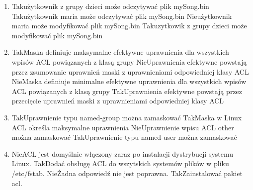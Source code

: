 \begin{enumerate}
	\item {}
	{Tak}{użytkownik z grupy dzieci może odczytywać plik mySong.bin}
	{Tak}{użytkownik maria może odczytywać plik mySong.bin}
	{Nie}{użytkownik maria może modyfikować plik mySong.bin}
	{Tak}{uzytkowik z grupy dzieci może modyfikować plik mySong.bin}
	
	\newpage
	
	\item {}
	{Tak}{Maska definiuje maksymalne efektywne uprawnienia dla wszystkich wpisów ACL powiązanych z klasą grupy}
	{Nie}{Uprawnienia efektywne powstają przez zsumowanie uprawnień maski z uprawnieniami odpowiedniej klasy ACL}
	{Nie}{Maska definiuje minimalne efektywne uprawnienia dla wszystkich wpisów ACL powiązanych z klasą grupy}
	{Tak}{Uprawnienia efektywne powstają przez przecięcie uprawnień maski z uprawnieniami odpowiedniej klasy ACL}

	\item {}
	{Tak}{Uprawnienie typu named-group można zamaskować}
	{Tak}{Maska w Linux ACL określa maksymalne uprawnienia}
	{Nie}{Uprawnienie wpisu ACL other można zamaskować}
	{Tak}{Uprawnienie typu named-user można zamaskować}
	
	\item {}
	{Nie}{ACL jest domyślnie włączony zaraz po instalacji dystrybucji systemu Linux.}
	{Tak}{Dodać obsługę ACL do wszytskich systemów plików w pliku /etc/fstab.}
	{Nie}{Żadna odpowiedź nie jest poprawna.}
	{Tak}{Zainstalować pakiet acl.}
	

\end{enumerate}

